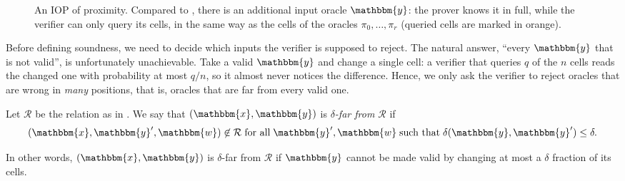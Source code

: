 \documentclass[../../book]{subfiles}
\begin{document}
\begin{figure}[h!]
{%
    }

    \caption{An IOP of proximity. Compared to , there is an additional input oracle $\mathbbm{y}$: the prover knows it in full, while the verifier can only query its cells, in the same way as the cells of the oracles $\pi_0, \dots, \pi_r$ (queried cells are marked in orange).}
    \label{fig:iopp-definition}
\end{figure}

Before defining soundness, we need to decide which inputs the verifier is supposed to reject.
The natural answer, ``every $\mathbbm{y}$ that is not valid'', is unfortunately unachievable.
Take a valid $\mathbbm{y}$ and change a single cell: a verifier that queries $q$ of the $n$ cells reads the changed one with probability at most $q/n$, so it almost never notices the difference.
Hence, we only ask the verifier to reject oracles that are wrong in \emph{many} positions, that is, oracles that are far from every valid one.

\begin{definition}
  Let $\mathcal{R}$ be the relation as in . 
  We say that $(\mathbbm{x}, \mathbbm{y})$ is \emph{$\delta$-far from $\mathcal{R}$} if 
  \begin{equation*}
    (\mathbbm{x},\mathbbm{y}',\mathbbm{w}) \not\in\mathcal{R} \; \text{for all} \; \mathbbm{y}',\mathbbm{w} \; \text{such that} \; \delta(\mathbbm{y}, \mathbbm{y}') \leq \delta.
  \end{equation*}
\end{definition}

In other words, $(\mathbbm{x}, \mathbbm{y})$ is $\delta$-far from $\mathcal{R}$ if $\mathbbm{y}$ cannot be made valid by changing at most a $\delta$ fraction of its cells.
\end{document}
